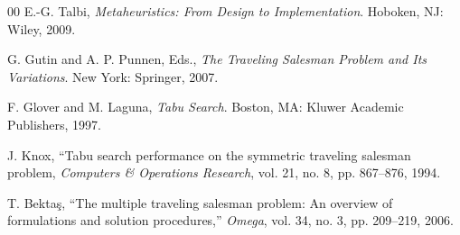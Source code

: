 \documentclass[conference]{IEEEtran}
\begin{document}
\begin{thebibliography}{00}
 E.-G. Talbi,
\textit{Metaheuristics: From Design to Implementation}.
Hoboken, NJ: Wiley, 2009.

 G. Gutin and A. P. Punnen, Eds.,
\textit{The Traveling Salesman Problem and Its Variations}.
New York: Springer, 2007.

 F. Glover and M. Laguna,
\textit{Tabu Search}.
Boston, MA: Kluwer Academic Publishers, 1997.

 J. Knox,
``Tabu search performance on the symmetric traveling salesman problem,
\textit{Computers \& Operations Research}, vol. 21, no. 8, pp. 867--876, 1994.

 T. Bekta\c{s},
``The multiple traveling salesman problem: An overview of formulations and solution procedures,''
\textit{Omega}, vol. 34, no. 3, pp. 209--219, 2006.

\end{thebibliography}
\end{document}
